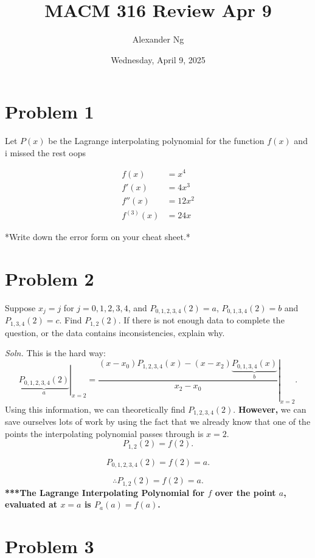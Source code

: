 \documentclass[12pt]{article}
\newcommand{\soln}{\textit{Soln.}\xspace}
\begin{document}
\title{MACM 316 Review Apr 9}
\author{Alexander Ng}
\date{Wednesday, April 9, 2025}

\maketitle

\section{Problem 1}
Let $P(x)$ be the Lagrange interpolating polynomial for the function $f(x)$
and i missed the rest oops

\begin{align*}
  f(x) &= x^4 \\
  f'(x) &= 4x^3 \\
  f''(x) &= 12x^2 \\
  f^{(3)}(x) &= 24x
\end{align*}

*Write down the error form on your cheat sheet.*

\section{Problem 2}

Suppose $x_j = j$ for $j=0,1,2,3,4$, and $P_{0,1,2,3,4}(2) = a$, $P_{0,1,3,4}(2)
= b$ and $P_{1,3,4}(2) = c$. Find $P_{1,2}(2)$. If there is not enough data to
complete the question, or the data contains inconsistencies, explain why.

\soln This is the hard way:
\[
  \left.\underbrace{P_{0,1,2,3,4}(2)}_{a}\right|_{x=2} = 
    \left.
      \frac{
        (x-x_0)P_{1,2,3,4}(x) - (x-x_2) 
        \underbrace{
          P_{0,1,3,4}(x)
        }_{b}
      }{x_2-x_0}
      \right|_{x=2}
.\]
Using this information, we can theoretically find $P_{1,2,3,4}(2)$.
\textbf{However,} we can save ourselves lots of work by using the fact that we
already know that one of the points the interpolating polynomial passes through
is $x=2$.
\[
  P_{1,2}(2) = f(2)
.\]

\[
  P_{0,1,2,3,4}(2) = f(2) = a
.\]

\[
  \therefore P_{1,2}(2) = f(2) = a
.\]
\textbf{***The Lagrange Interpolating Polynomial for $f$ over the point $a$,
evaluated at $x=a$ is $P_{a}(a) = f(a)$.}

\section{Problem 3}
\end{document}
